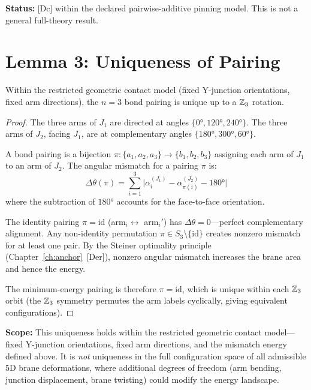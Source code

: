 \textbf{Status:} [Dc] within the declared pairwise-additive pinning model.
This is not a general full-theory result.

\section{Lemma 3: Uniqueness of Pairing}

\begin{lemma}
\label{lem:uniqueness}
Within the restricted geometric contact model (fixed Y-junction orientations,
fixed arm directions), the $n = 3$ bond pairing is unique up to a $\mathbb{Z}_3$
rotation.
\end{lemma}

\begin{proof}
The three arms of $J_1$ are directed at angles $\{0°, 120°, 240°\}$.
The three arms of $J_2$, facing $J_1$, are at complementary angles
$\{180°, 300°, 60°\}$.

A bond pairing is a bijection $\pi: \{a_1, a_2, a_3\} \to \{b_1, b_2, b_3\}$
assigning each arm of $J_1$ to an arm of $J_2$. The angular mismatch for
a pairing $\pi$ is:
\begin{equation}
    \Delta\theta(\pi) = \sum_{i=1}^{3}
        \bigl|\alpha_i^{(J_1)} - \alpha_{\pi(i)}^{(J_2)} - 180°\bigr|
    \label{eq:mismatch}
\end{equation}
where the subtraction of $180°$ accounts for the face-to-face orientation.

The identity pairing $\pi = \text{id}$ (arm$_i \leftrightarrow$ arm$_i'$)
has $\Delta\theta = 0$---perfect complementary alignment. Any non-identity
permutation $\pi \in S_3 \setminus \{\text{id}\}$ creates nonzero mismatch
for at least one pair. By the Steiner optimality principle
(Chapter~\ref{ch:anchor}~[Der]), nonzero angular mismatch increases the
brane area and hence the energy.

The minimum-energy pairing is therefore $\pi = \text{id}$, which is unique
within each $\mathbb{Z}_3$ orbit (the $\mathbb{Z}_3$ symmetry permutes the arm labels
cyclically, giving equivalent configurations).
\end{proof}

\textbf{Scope:} This uniqueness holds within the restricted geometric contact
model---fixed Y-junction orientations, fixed arm directions, and the mismatch
energy defined above. It is \emph{not} uniqueness in the full configuration
space of all admissible 5D brane deformations, where additional degrees of
freedom (arm bending, junction displacement, brane twisting) could modify
the energy landscape.

